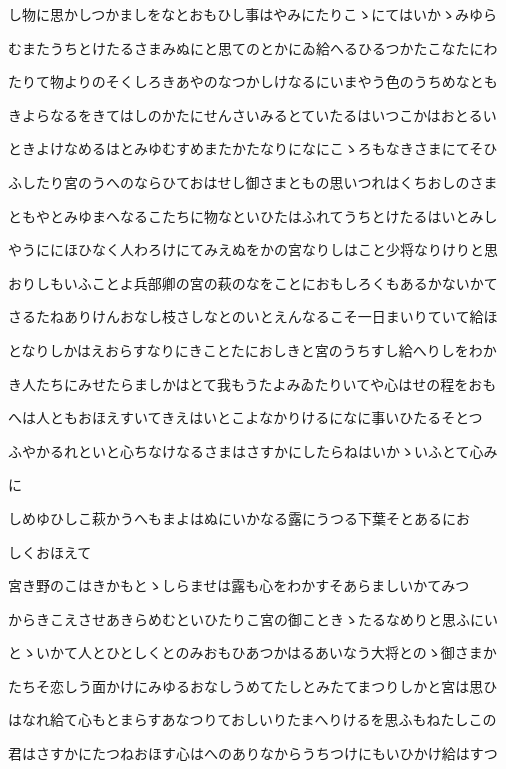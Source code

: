 \documentclass[a4paper,11pt,landscape]{ltjtarticle}
\begin{document}
し物に思かしつかましをなとおもひし事はやみにたりこゝにてはいかゝみゆら
\par\medskip
むまたうちとけたるさまみぬにと思てのとかにゐ給へるひるつかたこなたにわ
\par\medskip
たりて物よりのそくしろきあやのなつかしけなるにいまやう色のうちめなとも
\par\medskip
きよらなるをきてはしのかたにせんさいみるとていたるはいつこかはおとるい
\par\medskip
ときよけなめるはとみゆむすめまたかたなりになにこゝろもなきさまにてそひ
\par\medskip
ふしたり宮のうへのならひておはせし御さまともの思いつれはくちおしのさま
\par\medskip
ともやとみゆまへなるこたちに物なといひたはふれてうちとけたるはいとみし
\par\medskip
やうににほひなく人わろけにてみえぬをかの宮なりしはこと少将なりけりと思
\par\medskip
おりしもいふことよ兵部卿の宮の萩のなをことにおもしろくもあるかないかて
\par\medskip
さるたねありけんおなし枝さしなとのいとえんなるこそ一日まいりていて給ほ
\par\medskip
となりしかはえおらすなりにきことたにおしきと宮のうちすし給へりしをわか
\par\medskip
き人たちにみせたらましかはとて我もうたよみゐたりいてや心はせの程をおも
\par\medskip
へは人ともおほえすいてきえはいとこよなかりけるになに事いひたるそとつ
\par\medskip
ふやかるれといと心ちなけなるさまはさすかにしたらねはいかゝいふとて心み
\par\medskip
に
\par\medskip
しめゆひしこ萩かうへもまよはぬにいかなる露にうつる下葉そとあるにお
\par\medskip
しくおほえて
\par\medskip
宮き野のこはきかもとゝしらませは露も心をわかすそあらましいかてみつ
\par\medskip
からきこえさせあきらめむといひたりこ宮の御こときゝたるなめりと思ふにい
\par\medskip
とゝいかて人とひとしくとのみおもひあつかはるあいなう大将とのゝ御さまか
\par\medskip
たちそ恋しう面かけにみゆるおなしうめてたしとみたてまつりしかと宮は思ひ
\par\medskip
はなれ給て心もとまらすあなつりておしいりたまへりけるを思ふもねたしこの
\par\medskip
君はさすかにたつねおほす心はへのありなからうちつけにもいひかけ給はすつ
\end{document}
